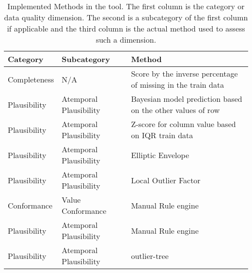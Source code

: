 \begin{table}[htpb]
\caption{Implemented Methods in the tool. The first column is the category or data quality dimension. The second is a subcategory of the first column if applicable and the third column is the actual method used to assess such a dimension.} \label{tab:methods}
\renewcommand{\arraystretch}{1.4}
\setlength{\tabcolsep}{10pt}

\begin{tabularx}{\textwidth}{ p{2cm} p{3.5cm} X }
\hline
 Category   & Subcategory           & Method   \\ \hline
Completeness     & N/A               & Score by the inverse percentage of missing in the train data         \\ 
Plausibility & Atemporal Plausibility & Bayesian model prediction based on the other values of row \\ 
Plausibility & Atemporal Plausibility         & Z-score for column value based on IQR train data       \\    
Plausibility & Atemporal Plausibility           & Elliptic Envelope                       \\ 
Plausibility & Atemporal Plausibility           & Local Outlier Factor                \\ 
Conformance & Value Conformance           & Manual Rule engine                           \\ 
Plausibility & Atemporal Plausibility           & Manual Rule engine                      \\ 
Plausibility & Atemporal Plausibility           & outlier-tree                      \\ 
\hline
\end{tabularx}

\end{table}

